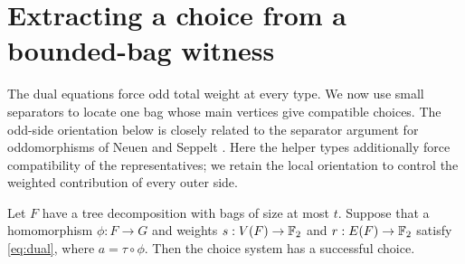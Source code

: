 \section{Extracting a choice from a bounded-bag witness}
\label{sec:separator}

The dual equations force odd total weight at every type.
We now use small separators to locate one bag whose main vertices
give compatible choices.
The odd-side orientation below is closely related to the separator
argument for oddomorphisms of Neuen and Seppelt
\citep[Lemma~4.4 and proof of Theorem~4.1]{NS2026}.
Here the helper types additionally force compatibility of the
representatives; we retain the local orientation to control the
weighted contribution of every outer side.

\begin{lemma}\label{lem:extract-choice}
Let \(F\) have a tree decomposition with bags of size at most \(t\).
Suppose that a homomorphism \(\phi:F\to G\) and weights
\(s:V(F)\to\mathbb F_2\) and \(r:E(F)\to\mathbb F_2\) satisfy
\eqref{eq:dual}, where \(a=\tau\circ\phi\).
Then the choice system has a successful choice.
\end{lemma}

